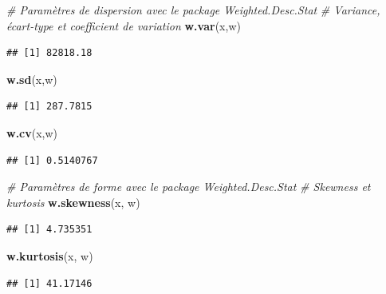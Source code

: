 \documentclass[
  11pt,
  french,
]{book}
\makeatletter
\newenvironment{Shaded}{\begin{snugshade}}{\end{snugshade}}
\newcommand{\CommentTok}[1]{\textcolor[rgb]{0.56,0.35,0.01}{\textit{#1}}}
\newcommand{\KeywordTok}[1]{\textcolor[rgb]{0.13,0.29,0.53}{\textbf{#1}}}
\newcommand{\NormalTok}[1]{#1}
\newenvironment{kframe}{%
\medskip{}
\setlength{\fboxsep}{.8em}
 \def\at@end@of@kframe{}%
 \ifinner\ifhmode%
  \def\at@end@of@kframe{\end{minipage}}%
  \begin{minipage}{\columnwidth}%
 \fi\fi%
 \def\FrameCommand##1{\hskip\@totalleftmargin \hskip-\fboxsep
 \colorbox{shadecolor}{##1}\hskip-\fboxsep
     \hskip-\linewidth \hskip-\@totalleftmargin \hskip\columnwidth}%
 \MakeFramed {\advance\hsize-\width
   \@totalleftmargin\z@ \linewidth\hsize
   \@setminipage}}%
 {\par\unskip\endMakeFramed%
 \at@end@of@kframe}
\renewenvironment{Shaded}{\begin{kframe}}{\end{kframe}}
\makeatother
\begin{document}
\begin{Shaded}
\begin{Highlighting}[]
\CommentTok{# Paramètres de dispersion avec le package Weighted.Desc.Stat}
\CommentTok{# Variance, écart-type et coefficient de variation}
\KeywordTok{w.var}\NormalTok{(x,w)}
\end{Highlighting}
\end{Shaded}

\begin{verbatim}
## [1] 82818.18
\end{verbatim}

\begin{Shaded}
\begin{Highlighting}[]
\KeywordTok{w.sd}\NormalTok{(x,w)}
\end{Highlighting}
\end{Shaded}

\begin{verbatim}
## [1] 287.7815
\end{verbatim}

\begin{Shaded}
\begin{Highlighting}[]
\KeywordTok{w.cv}\NormalTok{(x,w)}
\end{Highlighting}
\end{Shaded}

\begin{verbatim}
## [1] 0.5140767
\end{verbatim}

\begin{Shaded}
\begin{Highlighting}[]
\CommentTok{# Paramètres de forme avec le package Weighted.Desc.Stat}
\CommentTok{# Skewness et kurtosis }
\KeywordTok{w.skewness}\NormalTok{(x, w)}
\end{Highlighting}
\end{Shaded}

\begin{verbatim}
## [1] 4.735351
\end{verbatim}

\begin{Shaded}
\begin{Highlighting}[]
\KeywordTok{w.kurtosis}\NormalTok{(x, w)}
\end{Highlighting}
\end{Shaded}

\begin{verbatim}
## [1] 41.17146
\end{verbatim}
\end{document}
